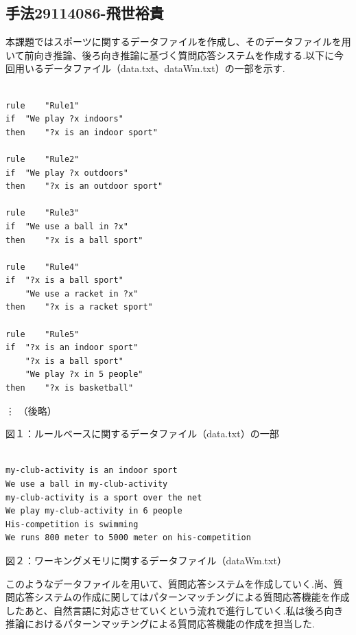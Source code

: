 \documentclass{jarticle}
\begin{document}
\subsection{手法29114086-飛世裕貴}
本課題ではスポーツに関するデータファイルを作成し、そのデータファイルを用いて前向き推論、後ろ向き推論に基づく質問応答システムを作成する.以下に今回用いるデータファイル（data.txt、dataWm.txt）の一部を示す.\\

\begin{screen}
\begin{verbatim}

rule 	"Rule1"
if 	"We play ?x indoors"
then 	"?x is an indoor sport"

rule 	"Rule2"
if 	"We play ?x outdoors"
then 	"?x is an outdoor sport"

rule 	"Rule3"
if 	"We use a ball in ?x"
then 	"?x is a ball sport"

rule 	"Rule4"
if 	"?x is a ball sport"
	"We use a racket in ?x"
then 	"?x is a racket sport"

rule 	"Rule5"
if 	"?x is an indoor sport"
	"?x is a ball sport"
	"We play ?x in 5 people"
then 	"?x is basketball"
\end{verbatim}
\vdots
（後略）

\end{screen}
\begin{center}
図１：ルールベースに関するデータファイル（data.txt）の一部\\
\end{center}


\begin{screen}
\begin{verbatim}

my-club-activity is an indoor sport
We use a ball in my-club-activity
my-club-activity is a sport over the net
We play my-club-activity in 6 people
His-competition is swimming
We runs 800 meter to 5000 meter on his-competition

\end{verbatim}
\end{screen}
\begin{center}
図２：ワーキングメモリに関するデータファイル（dataWm.txt）\\
\end{center}
このようなデータファイルを用いて、質問応答システムを作成していく.尚、質問応答システムの作成に関してはパターンマッチングによる質問応答機能を作成したあと、自然言語に対応させていくという流れで進行していく.私は後ろ向き推論におけるパターンマッチングによる質問応答機能の作成を担当した.
\end{document}

